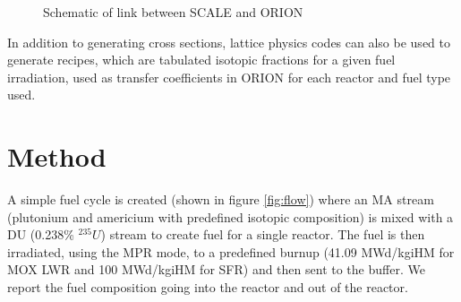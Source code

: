 \documentclass{article}
\begin{document}
 \begin{figure}[htbp!]
    \begin{center}
    \end{center}
    \caption{Schematic of link between SCALE and ORION}
    \label{fig:sch}
\end{figure}

In addition to generating cross sections, lattice physics codes can also be used to generate recipes, which are
tabulated isotopic fractions for a given fuel irradiation, used as transfer coefficients in ORION for each 
reactor and fuel type used. 

\section{Method}

A simple fuel cycle is created (shown in figure \ref{fig:flow}) where an \gls{MA} stream
(plutonium and americium with predefined isotopic composition) is mixed with a \gls{DU} (0.238\% $^{235}U$)
stream to create fuel for a single reactor. The fuel is then irradiated, using the MPR mode, to a predefined burnup (41.09 MWd/kgiHM for \gls{MOX} \gls{LWR}
and 100 MWd/kgiHM for \gls{SFR}) and then sent to the buffer. We report the fuel composition going into the
reactor and out of the reactor.
\end{document}
